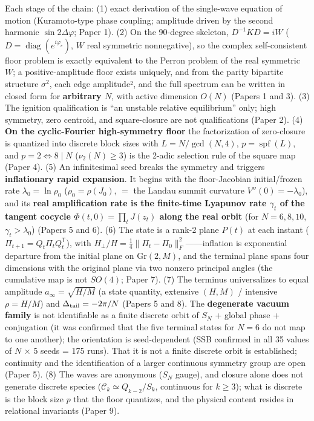\documentclass[
  a4paper,
]{ltjsarticle}
\begin{document}
Each stage of the chain: (1) exact derivation of the single-wave
equation of motion (Kuramoto-type phase coupling; amplitude driven by
the second harmonic \(\sin2\Delta\varphi\); Paper 1). (2) On the
90-degree skeleton, \(D^{-1}KD=iW\)
(\(D=\operatorname{diag}(e^{i\varphi_e})\), \(W\) real symmetric
nonnegative), so the complex self-consistent floor problem is exactly
equivalent to the Perron problem of the real symmetric \(W\); a
positive-amplitude floor exists uniquely, and from the parity bipartite
structure \(\sigma^2\), each edge amplitude², and the full spectrum can
be written in closed form for \textbf{arbitrary \(N\)}, with active
dimension \(O(N)\) (Papers 1 and 3). (3) The ignition qualification is
``an unstable relative equilibrium'' only; high symmetry, zero centroid,
and square-closure are not qualifications (Paper 2). (4) \textbf{On the
cyclic-Fourier high-symmetry floor} the factorization of zero-closure is
quantized into discrete block sizes with \(L=N/\gcd(N,4)\),
\(p=\operatorname{spf}(L)\), and \(p=2\iff 8\mid N\) (\(\nu_2(N)\ge3\))
is the 2-adic selection rule of the square map (Paper 4). (5) An
infinitesimal seed breaks the symmetry and triggers \textbf{inflationary
rapid expansion}. It begins with the floor-Jacobian initial/frozen rate
\(\lambda_0=\ln\rho_0\) (\(\rho_0=\rho(J_0)\), \(=\) the Landau summit
curvature \(V''(0)=-\lambda_0\)), and its \textbf{real amplification
rate is the finite-time Lyapunov rate \(\gamma_t\) of the tangent
cocycle \(\Phi(t,0)=\prod_t J(z_t)\) along the real orbit} (for
\(N=6,8,10\), \(\gamma_t>\lambda_0\)) (Papers 5 and 6). (6) The state is
a rank-2 plane \(P(t)\) at each instant
(\(\Pi_{t+1}=Q_t\Pi_tQ_t^{\mathsf T}\)), with
\(H_\perp/H=\tfrac14\|\Pi_t-\Pi_0\|_F^2\)------inflation is exponential
departure from the initial plane on \(\mathrm{Gr}(2,M)\), and the
terminal plane spans four dimensions with the original plane via two
nonzero principal angles (the cumulative map is not \(SO(4)\); Paper 7).
(7) The terminus universalizes to equal amplitude
\(a_\infty=\sqrt{H/M}\) (a state quantity, extensive \((H,M)\) /
intensive \(\rho=H/M\)) and \(\Delta_{\rm tail}=-2\pi/N\) (Papers 5 and
8). The \textbf{degenerate vacuum family} is not identifiable as a
finite discrete orbit of \(S_N\) + global phase + conjugation (it was
confirmed that the five terminal states for \(N=6\) do not map to one
another); the orientation is seed-dependent (SSB confirmed in all 35
values of \(N\) × 5 seeds = 175 runs). That it is not a finite discrete
orbit is established; continuity and the identification of a larger
continuous symmetry group are open (Paper 5). (8) The waves are
anonymous (\(S_N\) gauge), and closure alone does not generate discrete
species (\(\mathcal C_k\simeq Q_{k-2}/S_k\), continuous for \(k\ge3\));
what is discrete is the block size \(p\) that the floor quantizes, and
the physical content resides in relational invariants (Paper 9).
\end{document}
